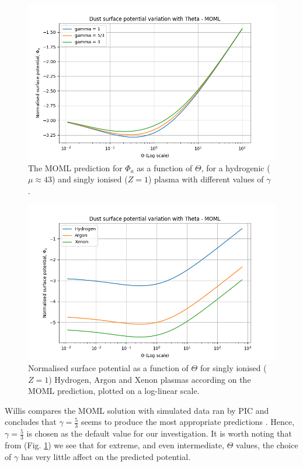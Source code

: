 \documentclass{article}
\begin{document}
\begin{figure}[H]
\centering
\includegraphics[width=\linewidth]{Output/MOMLgamma.jpeg}
\caption{The MOML prediction for  $\Phi_a$ as a function of $\Theta$, for a hydrogenic ($\mu \approx 43$) and singly ionised ($Z = 1$) plasma with different values of $\gamma$ \cite{Thomas}.}
\label{MOMLgamma} 
\end{figure}

\begin{figure}[H]
\centering
\includegraphics[width=\linewidth]{Output/MOMLgraph.jpeg}
\caption{Normalised surface potential as a function of $\Theta$ for singly ionised ($Z = 1$) Hydrogen, Argon and Xenon plasmas according on the MOML prediction, plotted on a log-linear scale.}
\label{MOMLgraph} 
\end{figure}

Willis compares the MOML solution with simulated data ran by PIC and concludes that 
$\gamma = \frac{5}{3}$ seems to produce the most appropriate predictions \cite{Willis}. 
Hence, $\gamma = \frac{5}{3}$ is chosen as the default value for our investigation. It is worth noting
that from (Fig. \ref{MOMLgamma}) we see that for extreme, and even intermediate, $\Theta$ values, 
the choice of $\gamma$ has very little affect on the predicted potential.
\end{document}
